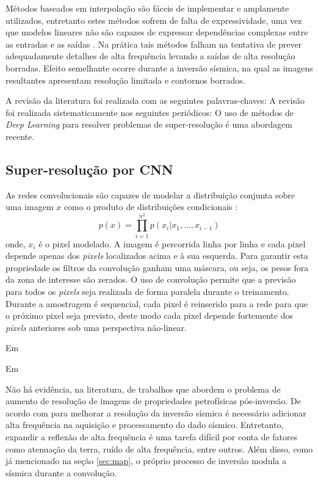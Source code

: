 Métodos baseados em interpolação são fáceis de implementar e amplamente utilizados,
entretanto estes métodos sofrem de falta de expressividade, uma vez que modelos lineares
não são capazes de expressar dependências complexas entre as entradas e as saídas \citep{HsiehAndrews1978}.
Na prática tais métodos falham na tentativa de prever adequadamente detalhes de alta frequência
levando a saídas de alta resolução borradas. Efeito semelhante ocorre durante a inversão sísmica,
na qual as imagens resultantes apresentam resolução limitada e contornos borrados.

A revisão da literatura foi realizada com as seguintes palavras-chaves:
A revisão foi realizada sistematicamente nos seguintes periódicos:
O uso de métodos de \textit{Deep Learning} para resolver problemas de super-resolução
é uma abordagem recente.

\subsection{Super-resolução por CNN}

As redes convolucionais são capazes de modelar a distribuição conjunta sobre
uma imagem $x$ como o produto de distribuições condicionais \citep{Oord16}:
\begin{equation}
\label{eqn:prodcnn}
p(x) = \prod_{i=1}^{n^2}p(x_i|x_1,...,x_{i-1})
\end{equation}
onde, $x_i$ é o pixel modelado. A imagem é percorrida linha por linha e cada
pixel depende apenas dos \textit{pixels} localizados acima e à sua esquerda.
Para garantir esta propriedade os filtros da convolução ganham uma máscara,
ou seja, os pesos fora da zona de interesse são zerados.
O uso de convolução permite que a previsão para todos os \textit{pixels} seja realizada de
forma paralela durante o treinamento. Durante a amostragem é sequencial,
cada pixel é reinserido para a rede para que o próximo pixel seja previsto,
deste modo cada pixel depende fortemente dos \textit{pixels} anteriores
sob uma perspectiva não-linear.


Em \cite{Dong16}

Em \cite{DahlNS17}

Não há evidência, na literatura, de trabalhos que abordem o problema de aumento de resolução
de imagens de propriedades petrofísicas pós-inversão. De acordo com \cite{Xiaoyu2012}
para melhorar a resolução da inversão sísmica é necessário adicionar alta frequência
na aquisição e processamento do dado sísmico. Entretanto, expandir a reflexão de alta frequência é uma tarefa
difícil por conta de fatores como atenuação da terra, ruído de alta frequência, 
entre outros. Além disso, como já mencionado na seção \ref{sec:map}, o próprio processo
de inversão modula a sísmica durante a convolução.

